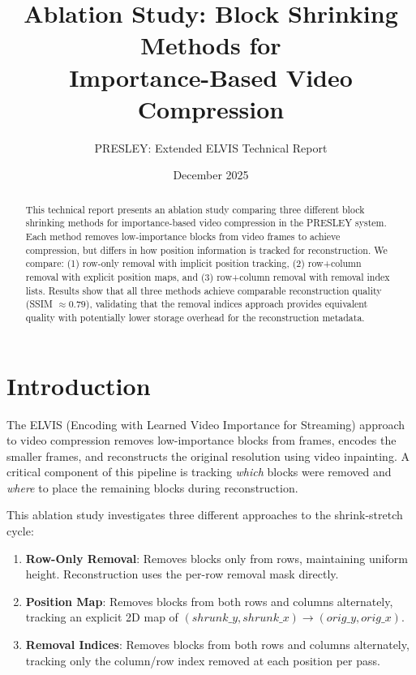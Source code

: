\documentclass[11pt,a4paper]{article}
\title{Ablation Study: Block Shrinking Methods for\\Importance-Based Video Compression}
\author{PRESLEY: Extended ELVIS Technical Report}
\date{December 2025}
\begin{document}
\maketitle

\begin{abstract}
This technical report presents an ablation study comparing three different block shrinking methods for importance-based video compression in the PRESLEY system. Each method removes low-importance blocks from video frames to achieve compression, but differs in how position information is tracked for reconstruction. We compare: (1) row-only removal with implicit position tracking, (2) row+column removal with explicit position maps, and (3) row+column removal with removal index lists. Results show that all three methods achieve comparable reconstruction quality (SSIM $\approx 0.79$), validating that the removal indices approach provides equivalent quality with potentially lower storage overhead for the reconstruction metadata.
\end{abstract}

\section{Introduction}

The ELVIS (Encoding with Learned Video Importance for Streaming) approach to video compression removes low-importance blocks from frames, encodes the smaller frames, and reconstructs the original resolution using video inpainting. A critical component of this pipeline is tracking \emph{which} blocks were removed and \emph{where} to place the remaining blocks during reconstruction.

This ablation study investigates three different approaches to the shrink-stretch cycle:

\begin{enumerate}
    \item \textbf{Row-Only Removal}: Removes blocks only from rows, maintaining uniform height. Reconstruction uses the per-row removal mask directly.
    \item \textbf{Position Map}: Removes blocks from both rows and columns alternately, tracking an explicit 2D map of $(shrunk\_y, shrunk\_x) \rightarrow (orig\_y, orig\_x)$.
    \item \textbf{Removal Indices}: Removes blocks from both rows and columns alternately, tracking only the column/row index removed at each position per pass.
\end{enumerate}
\end{document}
